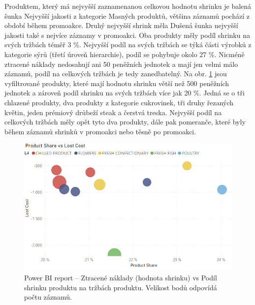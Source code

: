 Produktem, který má nejvyšší zaznamenanou celkovou hodnotu shrinku je balená šunka Nejvyšší jakosti z kategorie Masných produktů, většina záznamů pochází z období během promoakce. Druhý nejvyšší shrink měla Dušená šunka nejvyšší jakosti také s nejvíce záznamy v promoakci. Oba produkty měly podíl shrinku na svých tržbách téměř 3 \%.  
Nejvyšší podíl na svých tržbách se týká části výrobků z kategorie sýrů (třetí úroveň hierarchie), podíl se pohybuje okolo 27 \%. Nicméně ztracené náklady nedosahují ani 50 peněžních jednotek a mají jen velmi málo záznamů, podíl na celkových tržbách je tedy zanedbatelný.
Na obr. \ref*{obr:PBI:l3prod} jsou vyfiltrované produkty, které mají hodnotu shrinku větší než 500 peněžních jednotek a zároveň podíl shrinku na svých tržbách více jak 20 \%. Jedná se o tři chlazené produkty, dva produkty z kategorie cukrovinek, tři druhy řezaných květin, jeden prémiový drůbeží steak a čerstvá treska. 
Nejvyšší podíl na celkových tržbách měly opět tyto dva produkty, dále pak pomeranče, které byly během záznamů shrinků v promoakci nebo těsně po promoakci.

\begin{figure}[h!]
    \centering
    \captionsetup{justification=centering}
    \includegraphics[width=.8\textwidth]{obrazky/PBI/l3pprductshare.png}
    \caption{Power BI report -- Ztracené náklady (hodnota shrinku) vs Podíl shrinku produktu na tržbách produktu. Velikost bodů odpovídá počtu záznamů.}
    \label{obr:PBI:l3prod}
\end{figure}